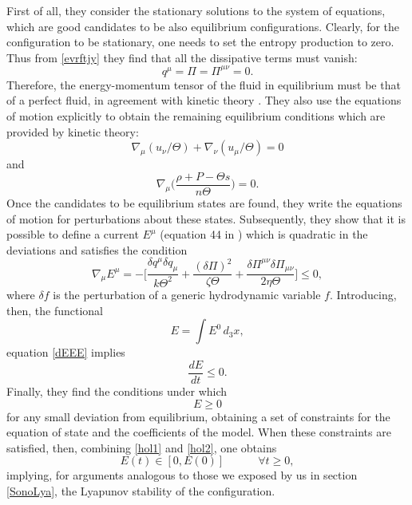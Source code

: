\documentclass[a4paper, amsfonts, amssymb, amsmath, reprint, showkeys, nofootinbib, twoside]{revtex4-1}
\newcommand{\spc}{\quad \quad \quad}
\begin{document}
First of all, they consider the stationary solutions to the system of equations, which are good candidates to be also equilibrium configurations. 
Clearly, for the configuration to be stationary, one needs to set the entropy production to zero. Thus from \eqref{evrftjy} they find that all the dissipative terms must vanish:
\begin{equation}\label{qawsdef}
q^\mu = \Pi = \Pi^{\mu \nu}=0.
\end{equation}
Therefore, the energy-momentum tensor of the fluid in equilibrium must be that of a perfect fluid, in agreement with kinetic theory \citep{cercignani_book,degroot_book}. 
They also use the equations of motion explicitly to obtain the remaining equilibrium conditions which are provided by kinetic theory: 
\begin{equation}
\nabla_\mu (u_\nu/\Theta)+\nabla_\nu (u_\mu/\Theta) =0 
\end{equation}
and
\begin{equation}
\nabla_\mu \bigg( \dfrac{\rho +P -\Theta s}{n\Theta} \bigg)=0.
\end{equation}
Once the candidates to be equilibrium states are found, they write the equations of motion for perturbations about these states. Subsequently, they show that it is possible to define a current $E^\mu$ (equation 44 in \cite{Hishcock1983}) which is quadratic in the deviations and  satisfies the condition
\begin{equation}\label{dEEE}
\nabla_\mu E^\mu = -\bigg[\dfrac{\delta q^\mu \delta q_\mu}{k\Theta^2} + \dfrac{(\delta \Pi)^2}{\zeta \Theta} + \dfrac{\delta\Pi^{\mu \nu}\delta\Pi_{\mu \nu}}{2\eta \Theta}   \bigg] \leq 0,
\end{equation}
where $\delta f$ is the perturbation of a generic hydrodynamic variable $f$. Introducing, then, the functional
\begin{equation}\label{EEEEEEt}
E = \int E^0 \, d_3 x,
\end{equation}
equation \eqref{dEEE} implies
\begin{equation}\label{hol1}
\dfrac{dE}{dt} \leq 0.
\end{equation}
Finally, they find the conditions under which 
\begin{equation}\label{hol2}
E \geq 0
\end{equation}
for any small deviation from equilibrium, obtaining a set of constraints for the equation of state and the coefficients of the model. When these constraints are satisfied, then, combining \eqref{hol1} and \eqref{hol2}, one obtains
\begin{equation}
E(t) \in [0,E(0)]  \spc \forall t \geq 0,
\end{equation}
implying, for arguments analogous to those we exposed by us in section \ref{SonoLya}, the Lyapunov stability of the configuration.
\end{document}
